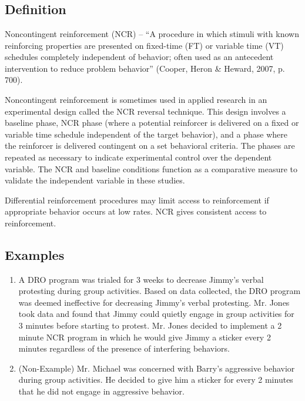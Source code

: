 \clearpage \section[\fourdTwenty{}]{\fourdTwenty{}%
              }
\subsection{Definition}
Noncontingent reinforcement (NCR) – ``A procedure in which stimuli with known reinforcing properties are presented on fixed-time (FT) or variable time (VT) schedules completely independent of behavior; often used as an antecedent intervention to reduce problem behavior'' (Cooper, Heron \& Heward, 2007, p. 700).

Noncontingent reinforcement is sometimes used in applied research in an experimental design called the NCR reversal technique. This design involves a baseline phase, NCR phase (where a potential reinforcer is delivered on a fixed or variable time schedule independent of the target behavior), and a phase where the reinforcer is delivered contingent on a set behavioral criteria. The phases are repeated as necessary to indicate experimental control over the dependent variable. The NCR and baseline conditions function as a comparative measure to validate the independent variable in these studies.

Differential reinforcement procedures may limit access to reinforcement if appropriate behavior occurs at low rates. NCR gives consistent access to reinforcement. 
%
\subsection{Examples}
\begin{enumerate}
\item A DRO program was trialed for 3 weeks to decrease Jimmy's verbal protesting during group activities. Based on data collected, the DRO program was deemed ineffective for decreasing Jimmy's verbal protesting. Mr. Jones took data and found that Jimmy could quietly engage in group activities for 3 minutes before starting to protest. Mr. Jones decided to implement a 2 minute NCR program in which he would give Jimmy a sticker every 2 minutes regardless of the presence of interfering behaviors.
\item (Non-Example) Mr. Michael was concerned with Barry's aggressive behavior during group activities. He decided to give him a sticker for every 2 minutes that he did not engage in aggressive behavior.
\end{enumerate}
%
